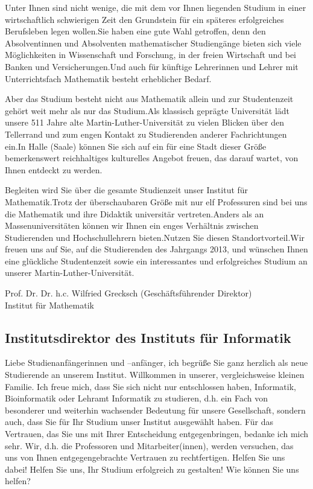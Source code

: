 Unter Ihnen sind nicht wenige, die mit dem vor Ihnen liegenden Studium in einer wirtschaftlich schwierigen Zeit den Grundstein für ein späteres erfolgreiches Berufsleben legen wollen.Sie haben eine gute Wahl getroffen, denn den Absolventinnen und Absolventen mathematischer Studiengänge bieten sich viele Möglichkeiten in Wissenschaft und Forschung, in der freien Wirtschaft und bei Banken und Versicherungen.Und auch für künftige Lehrerinnen und Lehrer mit Unterrichtsfach Mathematik besteht erheblicher Bedarf.

Aber das Studium besteht nicht aus Mathematik allein und zur Studentenzeit gehört weit mehr als nur das Studium.Als klassisch geprägte Universität lädt unsere 511 Jahre alte Martin-Luther-Universität zu vielen Blicken über den Tellerrand und zum engen Kontakt zu Studierenden anderer Fachrichtungen ein.In Halle (Saale) können Sie sich auf ein für eine Stadt dieser Größe bemerkenswert reichhaltiges kulturelles Angebot freuen, das darauf wartet, von Ihnen entdeckt zu werden.

Begleiten wird Sie über die gesamte Studienzeit unser Institut für Mathematik.Trotz der überschaubaren Größe mit nur elf Professuren sind bei uns die Mathematik und ihre Didaktik universitär vertreten.Anders als an Massenuniversitäten können wir Ihnen ein enges Verhältnis zwischen Studierenden und Hochschullehrern bieten.Nutzen Sie diesen Standortvorteil.Wir freuen uns auf Sie, auf die Studierenden des Jahrgangs 2013, und wünschen Ihnen eine glückliche Studentenzeit sowie ein interessantes und erfolgreiches Studium an unserer Martin-Luther-Universität.


Prof. Dr. Dr. h.c. Wilfried Grecksch (Geschäftsführender Direktor)\\
Institut für Mathematik
    

\subsection{Institutsdirektor des Instituts für Informatik}

Liebe Studienanfängerinnen und –anfänger,
ich begrüße Sie ganz herzlich als neue Studierende an unserem Institut. Willkommen in unserer, vergleichsweise kleinen Familie. Ich freue mich, dass Sie sich nicht nur entschlossen haben, Informatik, Bioinformatik oder Lehramt Informatik zu studieren, d.h. ein Fach von  besonderer und weiterhin wachsender Bedeutung für unsere Gesellschaft, sondern auch, dass Sie für Ihr Studium unser Institut ausgewählt haben. 
Für das Vertrauen, das Sie uns mit Ihrer Entscheidung entgegenbringen, bedanke ich mich sehr. Wir, d.h. die Professoren und Mitarbeiter(innen), werden versuchen, das uns von Ihnen entgegengebrachte Vertrauen zu rechtfertigen. Helfen Sie uns dabei! Helfen Sie uns, Ihr Studium erfolgreich zu gestalten! 
Wie können Sie uns helfen?

